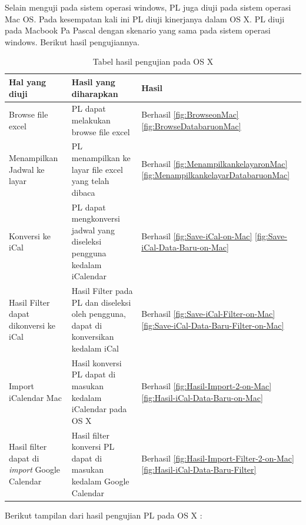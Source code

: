Selain menguji pada sistem operasi windows, PL juga diuji pada sistem operasi Mac OS. Pada kesempatan kali ini PL diuji kinerjanya dalam OS X. PL diuji pada Macbook Pa Pascal dengan skenario yang sama pada sistem operasi windows. Berikut hasil pengujiannya.
\begin{table}[H]
	\centering
		\caption{Tabel hasil pengujian pada OS X}
		\label{tab:eksperimental}
		\begin{tabular}{ | p{4cm} | p{4cm} | p{4cm} | }
			\hline
				Hal yang diuji & Hasil yang diharapkan & Hasil \\ \hline
				Browse file excel & PL dapat melakukan browse file excel & Berhasil \ref{fig:BrowseonMac} \ref{fig:BrowseDatabaruonMac}\\ \hline
				Menampilkan Jadwal ke layar & PL menampilkan ke layar file excel yang telah dibaca & Berhasil \ref{fig:MenampilkankelayaronMac}  \ref{fig:MenampilkankelayarDatabaruonMac}\\ \hline
				Konversi ke iCal & PL dapat mengkonversi jadwal yang diseleksi pengguna kedalam iCalendar & Berhasil \ref{fig:Save-iCal-on-Mac} \ref{fig:Save-iCal-Data-Baru-on-Mac} \\ \hline
				Hasil Filter dapat dikonversi ke iCal & Hasil Filter pada PL dan diseleksi oleh pengguna, dapat di konversikan kedalam iCal & Berhasil \ref{fig:Save-iCal-Filter-on-Mac} \ref{fig:Save-iCal-Data-Baru-Filter-on-Mac}  \\ \hline
				Import iCalendar Mac & Hasil konversi PL dapat di masukan kedalam iCalendar pada OS X & Berhasil \ref{fig:Hasil-Import-2-on-Mac} \ref{fig:Hasil-iCal-Data-Baru-on-Mac} \\ \hline
				Hasil filter dapat di \textit{import} Google Calendar & Hasil filter konversi PL dapat di masukan kedalam Google Calendar & Berhasil \ref{fig:Hasil-Import-Filter-2-on-Mac} \ref{fig:Hasil-iCal-Data-Baru-Filter}\\ \hline
		\end{tabular}
\end{table} 
	Berikut tampilan dari hasil pengujian PL pada OS X :

